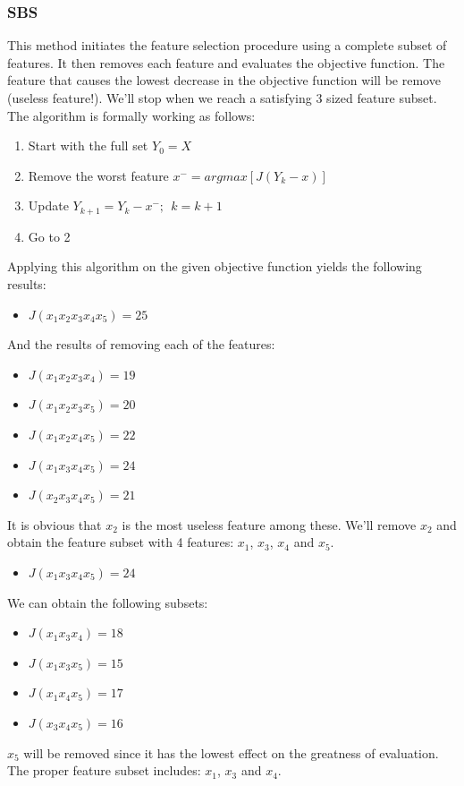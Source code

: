 \documentclass[12pt]{article}
\numberwithin{equation}{section}
\numberwithin{table}{section}
\numberwithin{figure}{section}
\begin{document}
\subsubsection*{SBS}
This method initiates the feature selection procedure using a complete subset of features. It then removes each feature and evaluates the objective function. The feature that causes the lowest decrease in the objective function will be remove (useless feature!). We'll stop when we reach a satisfying 3 sized feature subset. The algorithm is formally working as follows:
\begin{enumerate}
	\item Start with the full set $ Y_0 = X$
	\item Remove the worst feature $x^- = argmax[J(Y_k - x)]$
	\item Update $Y_{k + 1} = Y_{k} - x^-;\ \ k = k + 1 $
	\item Go to 2
\end{enumerate}
Applying this algorithm on the given objective function yields the following results:
\begin{itemize}
	\item $J(x_1x_2x_3x_4x_5) = 25$
\end{itemize}
And the results of removing each of the features:
\begin{itemize}
	\item $J(x_1x_2x_3x_4) = 19$
	\item $J(x_1x_2x_3x_5) = 20$
	\item $J(x_1x_2x_4x_5) = 22$
	\item $J(x_1x_3x_4x_5) = 24$
	\item $J(x_2x_3x_4x_5) = 21$
\end{itemize}
It is obvious that $x_2$ is the most useless feature among these. We'll remove $x_2$ and obtain the feature subset with 4 features: $x_1$, $x_3$, $x_4$ and $x_5$.
\begin{itemize}
	\item $J(x_1x_3x_4x_5) = 24$
\end{itemize}
We can obtain the following subsets:
\begin{itemize}
	\item $J(x_1x_3x_4) = 18$
	\item $J(x_1x_3x_5) = 15$
	\item $J(x_1x_4x_5) = 17$
	\item $J(x_3x_4x_5) = 16$
\end{itemize}
$x_5$ will be removed since it has the lowest effect on the greatness of evaluation.
The proper feature subset includes: $x_1$, $x_3$ and $x_4$.
\end{document}
